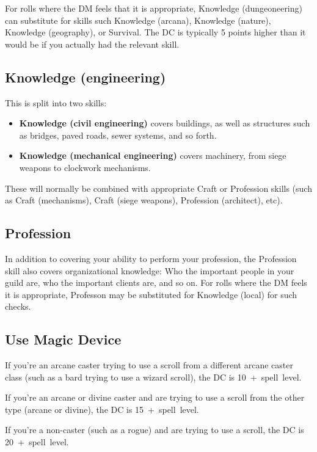 For rolls where the DM feels that it is appropriate, Knowledge
(dungeoneering) can substitute for skills such Knowledge (arcana),
Knowledge (nature), Knowledge (geography), or Survival. The DC is
typically 5 points higher than it would be if you actually had the
relevant skill.
%

%
\subsection{Knowledge (engineering)}

This is split into two skills:

\begin{itemize}
%
\item \textbf{Knowledge (civil engineering)} covers buildings, as well as
structures such as bridges, paved roads, sewer systems, and so forth.
%
\item \textbf{Knowledge (mechanical engineering)} covers machinery, from
siege weapons to clockwork mechanisms.
%
\end{itemize}

These will normally be combined with appropriate Craft or Profession
skills (such as Craft (mechanisms), Craft (siege weapons), Profession
(architect), etc).
%

%
\subsection{Profession}

In addition to covering your ability to perform your profession, the
Profession skill also covers organizational knowledge: Who the important
people in your guild are, who the important clients are, and so on. For
rolls where the DM feels it is appropriate, Professon may be substituted
for Knowledge (local) for such checks.
%

%
\subsection{Use Magic Device}

If you're an arcane caster trying to use a scroll from a different arcane
caster class (such as a bard trying to use a wizard scroll), the DC is
10~+~spell~level.

If you're an arcane or divine caster and are trying to use a scroll from
the other type (arcane or divine), the DC is 15~+~spell~level.

If you're a non-caster (such as a rogue) and are trying to use a scroll,
the DC is 20~+~spell~level.

